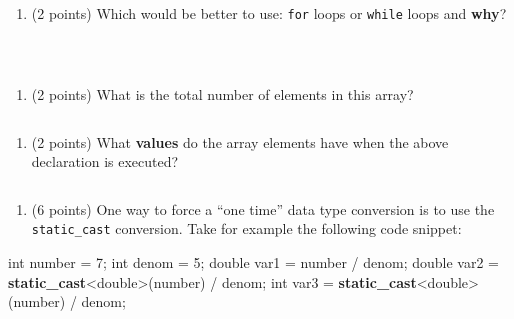 \documentclass[
]{article}
\newenvironment{Shaded}{}{}
\newcommand{\DataTypeTok}[1]{\textcolor[rgb]{0.56,0.13,0.00}{#1}}
\newcommand{\DecValTok}[1]{\textcolor[rgb]{0.25,0.63,0.44}{#1}}
\newcommand{\KeywordTok}[1]{\textcolor[rgb]{0.00,0.44,0.13}{\textbf{#1}}}
\newcommand{\NormalTok}[1]{#1}
\providecommand{\tightlist}{%
  \setlength{\itemsep}{0pt}\setlength{\parskip}{0pt}}
\begin{document}
\begin{enumerate}
\def\labelenumi{\alph{enumi}.}
\setcounter{enumi}{1}
\tightlist
\item
  (2 points) Which would be better to use: \texttt{for} loops or
  \texttt{while} loops and \textbf{why}?
\end{enumerate}

\begin{verbatim}



\end{verbatim}

\begin{enumerate}
\def\labelenumi{\alph{enumi}.}
\setcounter{enumi}{2}
\tightlist
\item
  (2 points) What is the total number of elements in this array?
\end{enumerate}

\begin{verbatim}

\end{verbatim}

\begin{enumerate}
\def\labelenumi{\alph{enumi}.}
\setcounter{enumi}{3}
\tightlist
\item
  (2 points) What \textbf{values} do the array elements have when the
  above declaration is executed?
\end{enumerate}

\begin{verbatim}

\end{verbatim}

\begin{enumerate}
\def\labelenumi{\arabic{enumi}.}
\setcounter{enumi}{5}
\tightlist
\item
  (6 points) One way to force a ``one time'' data type conversion is to
  use the \texttt{static\_cast} conversion. Take for example the
  following code snippet:
\end{enumerate}

\begin{Shaded}
\begin{Highlighting}[]
\DataTypeTok{int}\NormalTok{ number = }\DecValTok{7}\NormalTok{;}
\DataTypeTok{int}\NormalTok{ denom = }\DecValTok{5}\NormalTok{;}
\DataTypeTok{double}\NormalTok{ var1 = number / denom;}
\DataTypeTok{double}\NormalTok{ var2 = }\KeywordTok{static\_cast}\NormalTok{\textless{}}\DataTypeTok{double}\NormalTok{\textgreater{}(number) / denom;}
\DataTypeTok{int}\NormalTok{ var3 = }\KeywordTok{static\_cast}\NormalTok{\textless{}}\DataTypeTok{double}\NormalTok{\textgreater{}(number) / denom;}
\end{Highlighting}
\end{Shaded}
\end{document}
